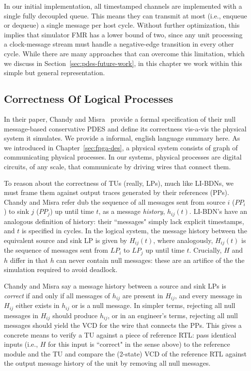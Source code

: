 In our initial implementation, all timestamped channels are implemented with a single fully decoupled queue.
This means they can transmit at most (i.e., enqueue
or dequeue) a single message per host cycle. Without further optimization, this
implies that simulator FMR has a lower bound of two, since any unit processing a
clock-message stream must handle a negative-edge transition in every other
cycle. While there are many approaches that can overcome this limitation, which
we discuss in Section~\ref{sec:pdes-future-work}, in this chapter we work within
this simple but general representation.

\subsection{Correctness Of Logical Processes}\label{sec:lp-correctness}

In their paper, Chandy and Misra~\cite{NullMessagesChandy} provide a formal
specification of their null message-based conservative PDES and define its correctness vis-a-vis the
physical system it simulates. We provide a informal, english language summary
here.  As we introduced in Chapter~\ref{sec:fpga-des}, a physical system
consists of graph of communicating physical processes. In our systems,
physical processes are digital circuits, of any scale, that communicate by
driving wires that connect them.

To reason about the correctness of TUs (really, LPs), much like LI-BDNs,
we must frame them against output traces generated by their references (PPs).
Chandy and Misra refer dub the sequence of all messages sent from source
$i$ ($PP_{i}$) to sink $j$ ($PP_{j}$) up until time $t$, as a message \emph{history},
$h_{ij}(t)$.  LI-BDN's have an analogous definition of history: their
``messages" simply lack explicit timestamps, and $t$ is specified in cycles.
In the logical system, the message history between the equivalent source and
sink LP is given by $H_{ij}(t)$, where analogously,  $H_{ij}(t)$ is the
sequence of messages sent from $LP_{i}$ to $LP_{j}$ up until time $t$. Crucially,
$H$ and $h$ differ in that $h$ can never contain null messages: these are an
artifice of the the simulation required to avoid deadlock.

Chandy and Misra say a message history between a source and sink LPs is
\emph{correct} if and only if all messages of $h_{ij}$ are present in $H_{ij}$,
and every message in $H_{ij}$ either exists in $h_{ij}$ or is a null message.
In simpler terms, rejecting all null messages in $H_{ij}$ should produce $h_{ij}$,
or in an engineer's terms, rejecting all null messages should yield the VCD for
the wire that connects the PPs. This gives a concrete means to verify a
TU against a piece of reference RTL: pass identical inputs (i.e., $H$
for this input is ``correct" in the sense above) to the reference module and the
TU and compare the (2-state) VCD of the reference RTL against the output
message history of the unit by removing all null messages.

